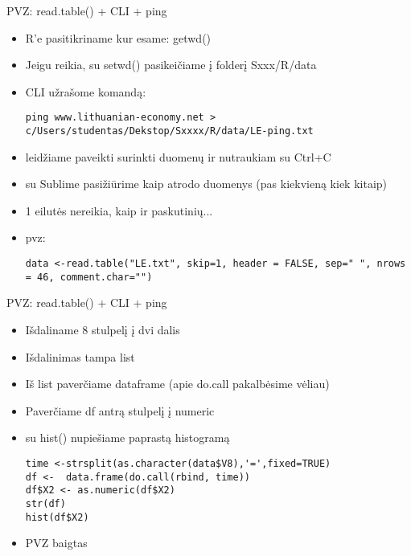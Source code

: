 \documentclass[11pt,xcolor=table]{beamer}
\begin{document}

\begin{frame}[fragile]{PVZ: read.table() + CLI + ping}

\begin{itemize}
\item R'e pasitikriname kur esame: getwd()
\item Jeigu reikia, su setwd() pasikeičiame į folderį Sxxx/R/data
\item CLI užrašome komandą: 
\begin{lstlisting}
ping www.lithuanian-economy.net > c/Users/studentas/Dekstop/Sxxxx/R/data/LE-ping.txt
\end{lstlisting}
\item leidžiame paveikti surinkti duomenų ir nutraukiam su Ctrl+C
\item su Sublime pasižiūrime kaip atrodo duomenys (pas kiekvieną kiek kitaip)
\item 1 eilutės nereikia, kaip ir paskutinių...
\item pvz: 
\begin{lstlisting}
data <-read.table("LE.txt", skip=1, header = FALSE, sep=" ", nrows = 46, comment.char="")
\end{lstlisting}
\end{itemize}
\end{frame}

\begin{frame}[fragile]{PVZ: read.table() + CLI + ping}
\begin{itemize}
\item Išdaliname 8 stulpelį į dvi dalis
\item Išdalinimas tampa list
\item Iš list paverčiame dataframe  (apie do.call pakalbėsime vėliau)
\item Paverčiame df antrą stulpelį į numeric
\item su hist() nupiešiame paprastą histogramą
\begin{lstlisting}
time <-strsplit(as.character(data$V8),'=',fixed=TRUE)
df <-  data.frame(do.call(rbind, time))
df$X2 <- as.numeric(df$X2)
str(df)
hist(df$X2)
\end{lstlisting}
\item PVZ baigtas
\end{itemize}
\end{frame}
\end{document}
